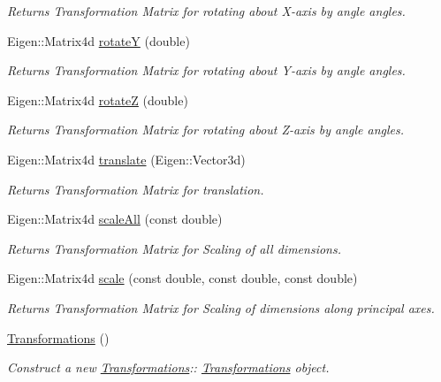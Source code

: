 \begin{DoxyCompactItemize}
\begin{DoxyCompactList}\small\item\em Returns Transformation Matrix for rotating about X-\/axis by \textquotesingle{}angle\textquotesingle{} angles. \end{DoxyCompactList}\item 
Eigen\+::\+Matrix4d \hyperlink{classTransformations_aa4a1b79a607ba97fa839c7f247ebc4df}{rotateY} (double)
\begin{DoxyCompactList}\small\item\em Returns Transformation Matrix for rotating about Y-\/axis by \textquotesingle{}angle\textquotesingle{} angles. \end{DoxyCompactList}\item 
Eigen\+::\+Matrix4d \hyperlink{classTransformations_af700b3a14795f2483e73dac667138907}{rotateZ} (double)
\begin{DoxyCompactList}\small\item\em Returns Transformation Matrix for rotating about Z-\/axis by \textquotesingle{}angle\textquotesingle{} angles. \end{DoxyCompactList}\item 
Eigen\+::\+Matrix4d \hyperlink{classTransformations_a7b7212f21b4e71ea50526e8359d74929}{translate} (Eigen\+::\+Vector3d)
\begin{DoxyCompactList}\small\item\em Returns Transformation Matrix for translation. \end{DoxyCompactList}\item 
Eigen\+::\+Matrix4d \hyperlink{classTransformations_a0948151585af910e7bd2c6734ecf9d5b}{scale\+All} (const double)
\begin{DoxyCompactList}\small\item\em Returns Transformation Matrix for Scaling of all dimensions. \end{DoxyCompactList}\item 
Eigen\+::\+Matrix4d \hyperlink{classTransformations_a43c9ba3fcb9d8fb440f3a686b8a99434}{scale} (const double, const double, const double)
\begin{DoxyCompactList}\small\item\em Returns Transformation Matrix for Scaling of dimensions along principal axes. \end{DoxyCompactList}\item 
\mbox{\label{classTransformations_a3dddecc6c02addaaa804e0c3ebb8163f}} 
\hyperlink{classTransformations_a3dddecc6c02addaaa804e0c3ebb8163f}{Transformations} ()
\begin{DoxyCompactList}\small\item\em Construct a new \hyperlink{classTransformations}{Transformations}\+:\+: \hyperlink{classTransformations}{Transformations} object. \end{DoxyCompactList}\end{DoxyCompactItemize}



